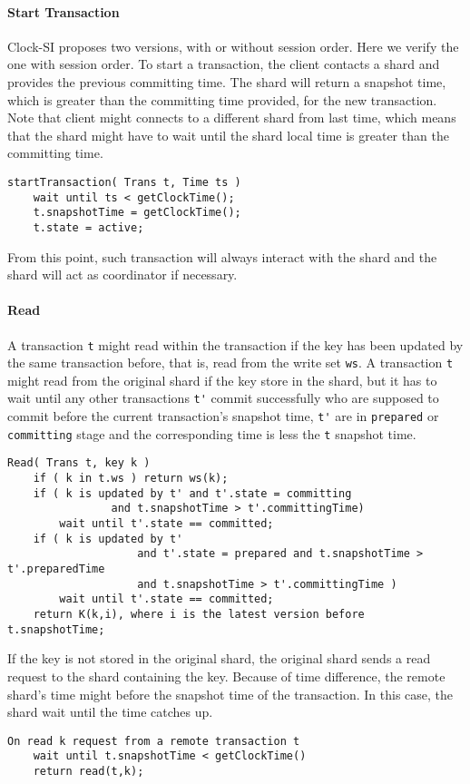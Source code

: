 \paragraph{\bf Start Transaction}
Clock-SI proposes two versions, with or without session order.
Here we verify the one with session order.
To start a transaction, the client contacts a shard 
and provides the previous committing time.
The shard will return a snapshot time, 
which is greater than the committing time provided, for the new transaction.
Note that client might connects to a different shard from last time,
which means that 
the shard might have to wait until the shard local time is greater than the committing time.
\begin{lstlisting}[caption={Transaction runtime},label={lst:clock-si-trans-runtime}]
startTransaction( Trans t, Time ts )
    wait until ts < getClockTime();
    t.snapshotTime = getClockTime();
    t.state = active;
\end{lstlisting}
From this point, such transaction will always interact with the shard and
the shard will act as coordinator if necessary.

\paragraph{\bf Read}
A transaction \verb|t| might read within the transaction if the key has been updated by the same transaction before,
that is, read from the write set \verb|ws|.
A transaction \verb|t| might read from the original shard if the key store in the shard,
but it has to wait until any other transactions \verb|t'| commit successfully
who are supposed to commit before the current transaction's snapshot time,
\ie \verb|t'| are in \verb|prepared| or \verb|committing| stage 
and the corresponding time is less the \verb|t| snapshot time.
\begin{lstlisting}[caption={Read from original shard},label={lst:clock-si-read-original}]
Read( Trans t, key k )
    if ( k in t.ws ) return ws(k);
    if ( k is updated by t' and t'.state = committing 
                and t.snapshotTime > t'.committingTime)
        wait until t'.state == committed;
    if ( k is updated by t' 
                    and t'.state = prepared and t.snapshotTime > t'.preparedTime 
                    and t.snapshotTime > t'.committingTime )
        wait until t'.state == committed;
    return K(k,i), where i is the latest version before t.snapshotTime;
\end{lstlisting}
If the key is not stored in the original shard, 
the original shard sends a read request to the shard containing the key.
Because of time difference, the remote shard's time might before the snapshot time of the transaction.
In this case, the shard wait until the time catches up.
\begin{lstlisting}[caption={Read from original shard},label={lst:clock-si-read-remote}]
On read k request from a remote transaction t
    wait until t.snapshotTime < getClockTime() 
    return read(t,k);
\end{lstlisting}

